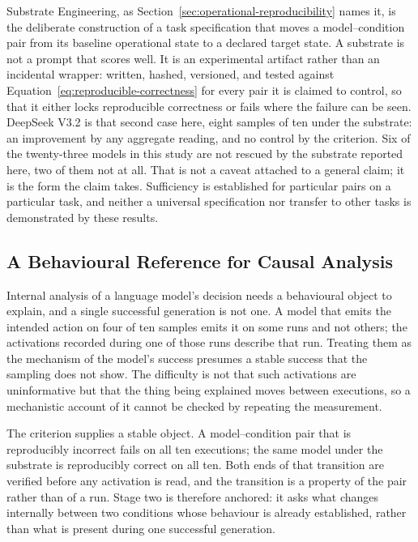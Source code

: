 Substrate Engineering, as Section~\ref{sec:operational-reproducibility} names it, is
the deliberate construction of a task specification that moves a model--condition
pair from its baseline operational state to a declared target state. A substrate is
not a prompt that scores well. It is an experimental artifact rather than an
incidental wrapper: written, hashed, versioned, and tested against
Equation~\eqref{eq:reproducible-correctness} for every pair it is claimed to control,
so that it either locks reproducible correctness or fails where the failure can be
seen. DeepSeek V3.2 is that second case here, eight samples of ten under the
substrate: an improvement by any aggregate reading, and no control by the criterion.
Six of the twenty-three models in this study
are not rescued by the substrate reported here, two of them not at all. That is not
a caveat attached to a general claim; it is the form the claim takes. Sufficiency is
established for particular pairs on a particular task, and neither a universal
specification nor transfer to other tasks is demonstrated by these results.


\subsection{A Behavioural Reference for Causal Analysis}
\label{sec:behavioural-reference}

Internal analysis of a language model's decision needs a behavioural object to
explain, and a single successful generation is not one. A model that emits the
intended action on four of ten samples emits it on some runs and not others; the
activations recorded during one of those runs describe that run. Treating them as
the mechanism of the model's success presumes a stable success that the sampling
does not show. The difficulty is not that such activations are uninformative but
that the thing being explained moves between executions, so a mechanistic account
of it cannot be checked by repeating the measurement.

The criterion supplies a stable object. A model--condition pair that is reproducibly
incorrect fails on all ten executions; the same model under the substrate is
reproducibly correct on all ten. Both ends of that transition are verified before
any activation is read, and the transition is a property of the pair rather than of
a run. Stage two is therefore anchored: it asks what changes internally between two
conditions whose behaviour is already established, rather than what is present
during one successful generation.

